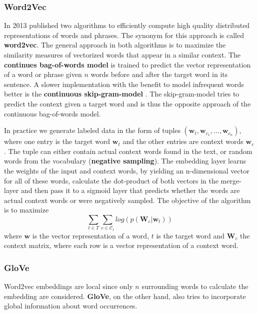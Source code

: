 \subsubsection{Word2Vec}

In 2013 \citeauthor{Mikolov2013} published two algorithms to efficiently compute high quality distributed representations of words and phrases. The synonym for this approach is called \textbf{word2vec}. The general approach in both algorithms is to maximize the similarity measures of vectorized words that appear in a similar context. The \textbf{continues bag-of-words model} is trained to predict the vector representation of a word or phrase given $n$ words before and after the target word in its sentence. A slower implementation with the benefit to model infrequent words better is the \textbf{continuous skip-gram-model} \citep{word2vec}. The skip-gram-model tries to predict the context given a target word and is thus the opposite approach of the continuous bag-of-words model.

In practice we generate labeled data in the form of tuples $(\mathbf{w}_t, \mathbf{w}_{c_{1}}, \dots, \mathbf{w}_{c_{n}})$, where one entry is the target word $\mathbf{w}_t$ and the other entries are context words $\mathbf{w}_c$. The tuple can either contain actual context words found in the text, or random words from the vocabulary (\textbf{negative sampling}). The embedding layer learns the weights of the input and context words, by yielding an n-dimensional vector for all of these words, calculate the dot-product of both vectors in the merge-layer and then pass it to a sigmoid layer that predicts whether the words are actual context words or were negatively sampled. The objective of the algorithm is to maximize
    \[\sum_{t \in T} \sum_{c \in \mathcal{C}_t} log( p(\mathbf{W}_c|\mathbf{w}_t))\]
    where $\mathbf{w}$ is the vector representation of a word, $t$ is the target word and $\mathbf{W}_c$ the context matrix, where each row is a vector representation of a context word.

\subsubsection{GloVe}

Word2vec embeddings are local since only $n$ surrounding words to calculate the embedding are considered. \textbf{GloVe}, on the other hand, also tries to incorporate global information about word occurrences.

